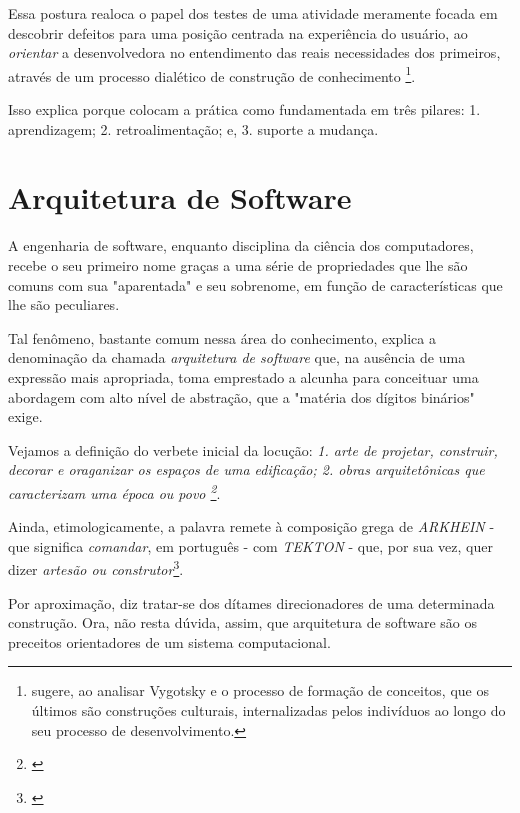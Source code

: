       Essa postura realoca o papel dos testes de uma atividade meramente focada
      em descobrir defeitos para uma posição centrada na experiência do
      usuário, ao  \emph{orientar} a desenvolvedora no entendimento das reais
      necessidades dos primeiros, através de um processo dialético de construção
      de conhecimento \footnote{ sugere, ao
      analisar Vygotsky e o processo de formação de conceitos, que os últimos
      são construções culturais, internalizadas pelos indivíduos ao longo do seu
      processo de desenvolvimento.}.

      Isso explica porque  colocam a prática
      como fundamentada em três pilares: 1. aprendizagem; 2. retroalimentação;
      e, 3. suporte a mudança.


  \section{Arquitetura de Software}

    A engenharia de software, enquanto disciplina da ciência dos
    computadores, recebe o seu primeiro nome graças a uma série de
    propriedades que lhe são comuns com sua "aparentada" e seu
    sobrenome, em função de características que lhe são peculiares.

    Tal fenômeno, bastante comum nessa área do conhecimento, explica a
    denominação da chamada \emph{arquitetura de software} que, na ausência de
    uma expressão mais apropriada, toma emprestado a alcunha para conceituar uma
    abordagem com alto nível de abstração, que a "matéria dos dígitos binários"
    exige.

    Vejamos a definição do verbete inicial da locução: \emph{1. arte de
    projetar, construir, decorar e oraganizar os espaços de uma edificação; 2.
    obras arquitetônicas que caracterizam uma época ou povo \footnote{\cite[p.
    81]{Kury2007}}}.

    Ainda, etimologicamente, a palavra remete à composição grega de \emph{
      ARKHEIN} - que significa \emph{comandar}, em português - com \emph{TEKTON}
    - que, por sua vez, quer dizer \emph{artesão ou construtor}\footnote{\cite{
    Etimologia2019}}.

    Por aproximação, diz tratar-se dos dítames direcionadores de uma determinada
    construção. Ora, não resta dúvida, assim, que arquitetura de software são os
    preceitos orientadores de um sistema computacional.

